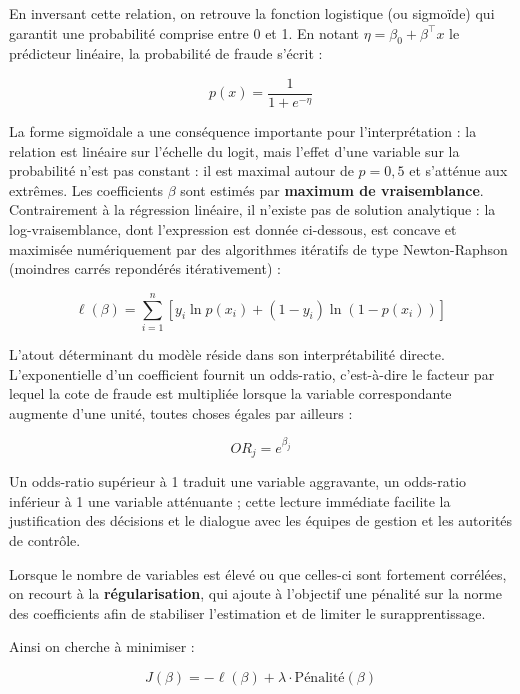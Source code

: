 En inversant cette relation, on retrouve la fonction logistique (ou sigmoïde) qui garantit une probabilité comprise entre 0 et 1. En notant $\eta = \beta_0 + \beta^\top x$ le prédicteur linéaire, la probabilité de fraude s'écrit :

\begin{equation}
    p(x) = \frac{1}{1 + e^{-\eta}}
\end{equation}

La forme sigmoïdale a une conséquence importante pour l'interprétation : la relation est linéaire sur l'échelle du logit, mais l'effet d'une variable sur la probabilité n'est pas constant : il est maximal autour de $p = 0{,}5$ et s'atténue aux extrêmes. Les coefficients $\beta$ sont estimés par \textbf{maximum de vraisemblance}. Contrairement à la régression linéaire, il n'existe pas de solution analytique : la log-vraisemblance, dont l'expression est donnée ci-dessous, est concave et maximisée numériquement par des algorithmes itératifs de type Newton-Raphson (moindres carrés repondérés itérativement) :

\begin{equation}
    \ell(\beta) = \sum_{i=1}^{n} \left[ y_i \ln p(x_i) + (1 - y_i) \ln (1 - p(x_i)) \right]
\end{equation}

L'atout déterminant du modèle réside dans son interprétabilité directe. L'exponentielle d'un coefficient fournit un odds-ratio, c'est-à-dire le facteur par lequel la cote de fraude est multipliée lorsque la variable correspondante augmente d'une unité, toutes choses égales par ailleurs :

\begin{equation}
    OR_j = e^{\beta_j}
\end{equation}

Un odds-ratio supérieur à 1 traduit une variable aggravante, un odds-ratio inférieur à 1 une variable atténuante ; cette lecture immédiate facilite la justification des décisions et le dialogue avec les équipes de gestion et les autorités de contrôle.

Lorsque le nombre de variables est élevé ou que celles-ci sont fortement corrélées, on recourt à la \textbf{régularisation}, qui ajoute à l'objectif une pénalité sur la norme des coefficients afin de stabiliser l'estimation et de limiter le surapprentissage.

Ainsi on cherche à minimiser :

\begin{equation}
    J(\beta) = -\ell(\beta) + \lambda \cdot \text{Pénalité}(\beta)
\end{equation}

